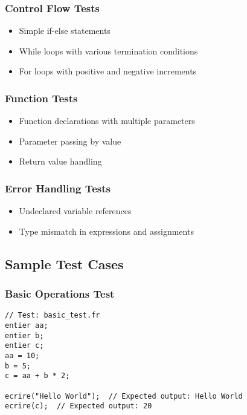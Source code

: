 \documentclass[12pt,a4paper]{article}
\begin{document}
\subsubsection{Control Flow Tests}

\begin{itemize}
    \item Simple if-else statements
    \item While loops with various termination conditions
    \item For loops with positive and negative increments
\end{itemize}

\subsubsection{Function Tests}

\begin{itemize}
    \item Function declarations with multiple parameters
    \item Parameter passing by value
    \item Return value handling
\end{itemize}

\subsubsection{Error Handling Tests}

\begin{itemize}
    \item Undeclared variable references
    \item Type mismatch in expressions and assignments
\end{itemize}

\subsection{Sample Test Cases}

\subsubsection{Basic Operations Test}

\begin{lstlisting}[language=French, caption={French Basic Operations Test}]
// Test: basic_test.fr
entier aa;
entier b;
entier c;
aa = 10;
b = 5;
c = aa + b * 2;

ecrire("Hello World");  // Expected output: Hello World
ecrire(c);  // Expected output: 20
\end{lstlisting}
\end{document}
